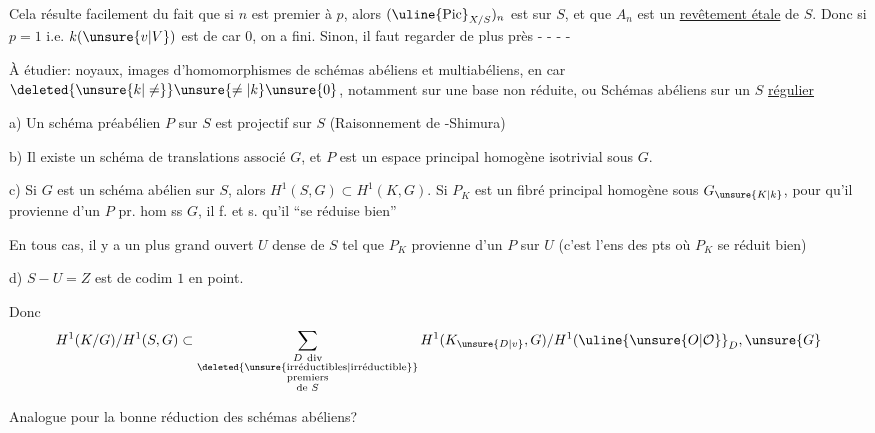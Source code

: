 Cela résulte facilement du fait que si
$n$ est premier à $p$, alors $(\uline{\mathrm{Pic}}_{X/S})_n$ est
  sur $S$, et que  $A_n$ est 
un \uline{revêtement étale} de $S$. Donc si $p=1$
i.e. $k(\unsure{v|V})$ est de car $0$, on a fini.
Sinon, il faut regarder de plus près  - - - -

À étudier: noyaux, images d'homomorphismes de
schémas abéliens et multiabéliens, en car $\deleted{\unsure{k|\ne}} \unsure{\ne|k} \unsure{0}$,
notamment sur une base non réduite, ou
Schémas abéliens sur un $S$ \uline{régulier}

a) Un schéma préabélien $P$ sur $S$ est projectif sur $S$
(Raisonnement de -Shimura)

b) Il existe un schéma de translations associé $G$,
et $P$ est un espace  principal homogène
 isotrivial sous $G$.

c) Si $G$ est un schéma abélien sur $S$, alors
$H^1(S,G)\subset H^1(K,G)$. Si $P_K$ est un
fibré principal homogène sous $G_{\unsure{K|k}}$, pour
qu'il  provienne d'un $P$ pr. hom
ss $G$, il f. et s. qu'il ``se réduise bien''

 En tous cas, il y a un plus grand
 ouvert $U$  dense de $S$ tel que
$P_K$ provienne d'un $P$ sur $U$ (c'est
l'ens des pts où $P_K$  se réduit bien)

d) $S-U=Z$ est de codim $1$ en  point.

Donc
\[
H^1(K/G)/H^1(S,G)\subset
\sum_{\substack{D\ \text{div}\\\deleted{\text{\unsure{irréductibles|irréductible}}}\\\text{premiers}\\\text{de }S}}
H^1(K_{\unsure{D|v}},G)/H^1(\uline{\unsure{O|\mathcal{O}}}_D,\unsure{G}
\]

Analogue  pour la bonne
réduction des schémas abéliens?
